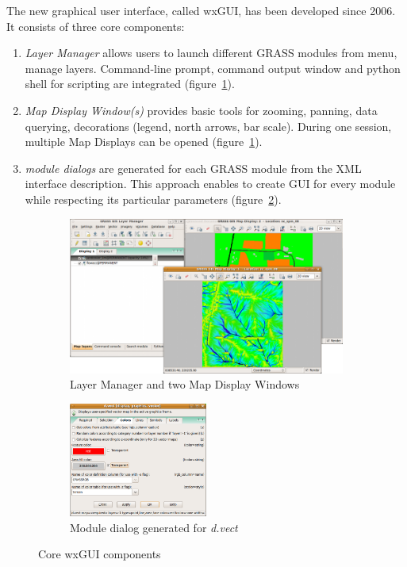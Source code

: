 \documentclass[a4paper,12pt,oneside]{book}
\newcommand{\module}[1]{\textsl{#1}}
\begin{document}
The new graphical user interface, called wxGUI, has been developed since 2006.
It consists of three core components:
    \begin{enumerate}
      \item \emph{Layer Manager} allows users to launch different GRASS modules from menu,
      manage layers. Command-line prompt, command output window and python shell
      for scripting are integrated (figure~\ref{fig:wxGUI1}).
      \item \emph{Map Display Window(s)} provides basic tools for zooming, panning, data querying,
      decorations (legend, north arrows, bar scale).
      During one session, multiple Map Displays can be opened (figure~\ref{fig:wxGUI1}).
      \item \emph{module dialogs} are generated for each GRASS module from the XML interface description.
      This approach enables to create GUI for every module while respecting its particular parameters
      (figure~\ref{fig:wxGUI2}).
    \end{enumerate}

\begin{figure}[ht!]
\centering
    \begin{subfigure}[ht]{\textwidth}
    \centering
        \includegraphics[width=\textwidth]{./images/wxGUI_1.png}
    \caption{Layer Manager and two Map Display Windows}
    \label{fig:wxGUI1}
    \end{subfigure}

\vspace{10pt}

    \begin{subfigure}[ht]{\textwidth}
    \centering
        \includegraphics[width=0.5\textwidth]{./images/wxGUI_2.png}
    \caption{Module dialog generated for \module{d.vect}}
    \label{fig:wxGUI2}
    \end{subfigure}
\caption{Core wxGUI components}
\label{fig:wxGUI}
\end{figure}
\end{document}
